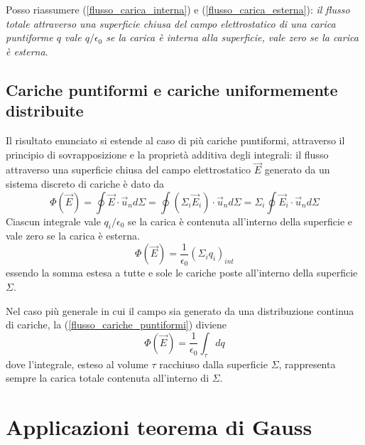 \documentclass[class=book, crop=false, oneside, 12pt]{standalone}
\begin{document}
Posso riassumere (\ref{flusso_carica_interna}) e (\ref{flusso_carica_esterna}): \emph{il flusso totale attraverso una superficie chiusa del campo elettrostatico di una carica puntiforme \(q\) vale \(q /\epsilon_0\) se la carica è interna alla superficie, vale zero se la carica è esterna}.

\subsection{Cariche puntiformi e cariche uniformemente distribuite}

Il risultato enunciato si estende al caso di più cariche puntiformi, attraverso il principio di sovrapposizione e la proprietà additiva degli integrali: 
il flusso attraverso una superficie chiusa del campo elettrostatico \(\overrightarrow{E}\) generato da un sistema discreto di cariche è dato da
\begin{equation*}
    \Phi (\overrightarrow{E}) = \oint \overrightarrow{E} \cdot \overrightarrow{u}_n d \Sigma = \oint (\Sigma_i \overrightarrow{E}_i) \cdot \overrightarrow{u}_n d \Sigma = \Sigma_i \oint \overrightarrow{E}_i \cdot \overrightarrow{u}_n d \Sigma
\end{equation*}
Ciascun integrale vale \(q_i / \epsilon_0\) se la carica è contenuta all'interno della superficie e vale zero se la carica è esterna.
\begin{equation} \label{flusso_cariche_puntiformi}
    \Phi (\overrightarrow{E}) = \frac{1}{\epsilon_0} (\Sigma_i q_i)_{int}
\end{equation}
essendo la somma estesa a tutte e sole le cariche poste all'interno della superficie \(\Sigma\).

Nel caso più generale in cui il campo sia generato da una distribuzione continua di cariche, la (\ref{flusso_cariche_puntiformi}) diviene
\begin{equation} \label{flusso_distribuzione_continua}
    \Phi (\overrightarrow{E}) = \frac{1}{\epsilon_0} \int_{\tau} dq
\end{equation}
dove l'integrale, esteso al volume \(\tau\) racchiuso dalla superficie \(\Sigma\), rappresenta sempre la carica totale contenuta all'interno di \(\Sigma\).

\section{Applicazioni teorema di Gauss}
\end{document}
